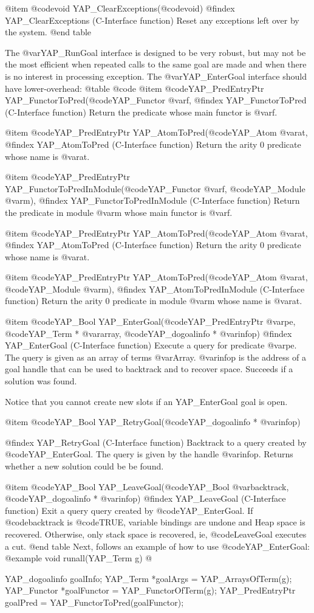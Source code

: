 {{{{{{{{@item  @code{void} YAP_ClearExceptions(@code{void})
@findex YAP_ClearExceptions (C-Interface function)
Reset any exceptions left over by the system.
@end table

The @var{YAP_RunGoal} interface is designed to be very robust, but may
not be the most efficient when repeated calls to the same goal are made
and when there is no interest in processing exception. The
@var{YAP_EnterGoal} interface should have lower-overhead:
@table @code
@item  @code{YAP_PredEntryPtr} YAP_FunctorToPred(@code{YAP_Functor} @var{f},
@findex YAP_FunctorToPred (C-Interface function)
Return the predicate whose main functor is @var{f}.

@item  @code{YAP_PredEntryPtr} YAP_AtomToPred(@code{YAP_Atom} @var{at},
@findex YAP_AtomToPred (C-Interface function)
Return the arity 0 predicate whose name is @var{at}.

@item  @code{YAP_PredEntryPtr}
YAP_FunctorToPredInModule(@code{YAP_Functor} @var{f}, @code{YAP_Module} @var{m}),
@findex YAP_FunctorToPredInModule (C-Interface function)
Return the predicate in module @var{m} whose main functor is @var{f}.

@item  @code{YAP_PredEntryPtr} YAP_AtomToPred(@code{YAP_Atom} @var{at},
@findex YAP_AtomToPred (C-Interface function)
Return the arity 0 predicate whose name is @var{at}.

@item  @code{YAP_PredEntryPtr} YAP_AtomToPred(@code{YAP_Atom} @var{at}, @code{YAP_Module} @var{m}),
@findex YAP_AtomToPredInModule (C-Interface function)
Return the arity 0 predicate in module @var{m} whose name is @var{at}.

@item  @code{YAP_Bool} YAP_EnterGoal(@code{YAP_PredEntryPtr} @var{pe},
@code{YAP_Term *} @var{array}, @code{YAP_dogoalinfo *} @var{infop})
@findex YAP_EnterGoal (C-Interface function)
Execute a  query for predicate @var{pe}. The query is given as an
array of terms @var{Array}. @var{infop} is the address of a goal
handle that can be used to backtrack and to recover space. Succeeds if
a solution was found.

Notice that you cannot create new slots if an YAP_EnterGoal goal is open.

@item  @code{YAP_Bool} YAP_RetryGoal(@code{YAP_dogoalinfo *} @var{infop})

@findex YAP_RetryGoal (C-Interface function)
Backtrack to a query created by @code{YAP_EnterGoal}. The query is
given by the handle @var{infop}. Returns whether a new solution could
be be found.

@item  @code{YAP_Bool} YAP_LeaveGoal(@code{YAP_Bool} @var{backtrack},
@code{YAP_dogoalinfo *} @var{infop})
@findex YAP_LeaveGoal (C-Interface function)
Exit a query query created by @code{YAP_EnterGoal}. If
@code{backtrack} is @code{TRUE}, variable bindings are undone and Heap
space is recovered.  Otherwise, only stack space is recovered, ie,
@code{LeaveGoal} executes a cut.
@end table
Next, follows an example of how to use @code{YAP_EnterGoal}:
@example
void
runall(YAP_Term g)
@{
    YAP_dogoalinfo goalInfo;
    YAP_Term *goalArgs = YAP_ArraysOfTerm(g);
    YAP_Functor *goalFunctor = YAP_FunctorOfTerm(g);
    YAP_PredEntryPtr goalPred = YAP_FunctorToPred(goalFunctor);
    
}}}}}}}}}
